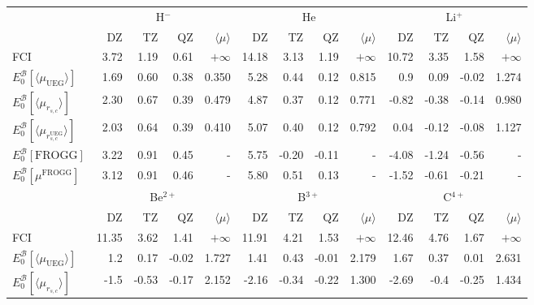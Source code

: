 \documentclass[aip,jcp,reprint,noshowkeys,superscriptaddress,twocolumn]{revtex4-1}
\newcommand{\frogg}[0]{\text{FROGG}}
\newcommand{\mfrogg}[0]{\mu^\text{FROGG}}
\newcommand{\basis}[0]{\mathcal{B}}
\newcommand{\muuegav}{\langle \mu_{\text{UEG}}\rangle}
\newcommand{\muav}{\langle \mu\rangle}
\newcommand{\murscav}{\langle \mu_{r_{s,c}}\rangle}
\newcommand{\mursclda}{\langle \mu_{r_{s,c}^{\text{UEG}}}\rangle}
\begin{document}
\begin{table}
\begin{ruledtabular}
\begin{tabular}{l|rrr|r||rrr|r||rrr|r|}
                         &\multicolumn{4}{c}{H$^-$}                & \multicolumn{4}{c}{He}                  & \multicolumn{4}{c}{Li$^+$}               \\
                         &   DZ    &  TZ      &   QZ    & $\muav$&  DZ     &   TZ     &  QZ  & $\muav$   &   DZ    &   TZ     &  QZ    & $\muav$  \\
\hline 
 FCI                     &   3.72  &    1.19  &   0.61  &$+\infty$ &  14.18  &   3.13   &  1.19&$+\infty$    &  10.72  &   3.35   &  1.58  &$+\infty$  \\      
$E_0^{\basis}[\muuegav]$ &   1.69  &    0.60  &   0.38  & 0.350    &  5.28   &   0.44   &  0.12& 0.815       &  0.9    &   0.09   & -0.02  & 1.274     \\      
$E_0^{\basis}[\murscav]$ &   2.30  &    0.67  &   0.39  & 0.479    &  4.87   &   0.37   &  0.12& 0.771       &  -0.82  &  -0.38   & -0.14  & 0.980     \\      
$E_0^{\basis}[\mursclda]$&   2.03  &    0.64  &   0.39  & 0.410    &  5.07   &   0.40   &  0.12& 0.792       &  0.04   &  -0.12   & -0.08  & 1.127     \\      
$E_0^{\basis}[\frogg]$   &   3.22  &    0.91  &   0.45  &    -     &  5.75   &  -0.20   & -0.11&   -         & -4.08   &  -1.24   & -0.56  &   -       \\
$E_0^{\basis}[\mfrogg]$  &   3.12  &    0.91  &   0.46  &    -     &  5.80   &   0.51   &  0.13&   -         & -1.52   &  -0.61   & -0.21  &   -       \\
\hline              
                         &\multicolumn{4}{c}{Be$^{2+}$}            & \multicolumn{4}{c}{B$^{3+}$}            & \multicolumn{4}{c}{C$^{4+}$}    \\
                         &   DZ    &  TZ      &   QZ    & $\muav$&  DZ     &   TZ     &  QZ     & $\muav$&   DZ    &   TZ     &  QZ    & $\muav$  \\
\hline 
 FCI                     &  11.35  &   3.62   &  1.41   &$+\infty$ &  11.91  &   4.21   &  1.53   &$+\infty$ &  12.46  &   4.76   &  1.67  &$+\infty$    \\  
$E_0^{\basis}[\muuegav]$ &  1.2    &   0.17   & -0.02   &1.727     &  1.41   &   0.43   &  -0.01  &2.179     &  1.67   &   0.37   &  0.01  &2.631        \\  
$E_0^{\basis}[\murscav]$ &  -1.5   &  -0.53   & -0.17   &2.152     &  -2.16  &  -0.34   &  -0.22  &1.300     &  -2.69  &  -0.4    & -0.25  &1.434        \\  

\end{tabular}
\end{ruledtabular}
\end{table}
\end{document}
